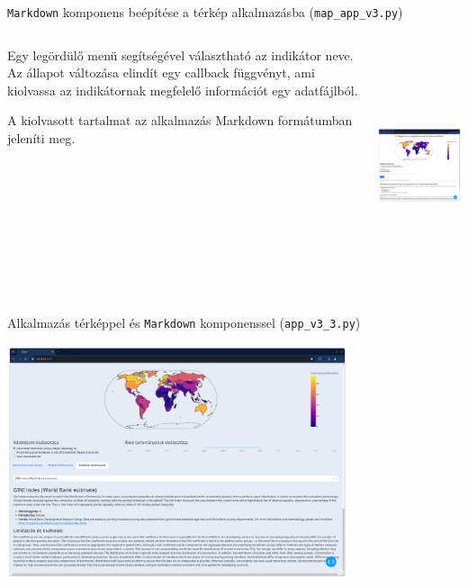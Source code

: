 \documentclass[english, aspectratio=169]{beamer}
\begin{document}
	\begin{frame}{\texttt{Markdown} komponens beépítése a térkép alkalmazásba (\texttt{map\_app\_v3.py})}
		\begin{columns}
			\begin{column}{.5\textwidth}
				Egy legördülő menü segítségével választható az indikátor neve. Az állapot változása elindít egy callback függvényt, ami kiolvassa az indikátornak megfelelő információt egy adatfájlból.\par\medskip
				A kiolvasott tartalmat az alkalmazás Markdown formátumban jeleníti meg.
			\end{column}
			\begin{column}{.5\textwidth}
				\begin{center}
					\includegraphics[width=7cm, height=7cm, keepaspectratio]{images/scatter_33.png}
				\end{center}
			\end{column}
		\end{columns}
	\end{frame}
	
	\begin{frame}{Alkalmazás térképpel és \texttt{Markdown} komponenssel (\texttt{app\_v3\_3.py})}
		\begin{center}
			\includegraphics[width=10cm, height=7cm, keepaspectratio]{images/scatter_32.png}
		\end{center}
	\end{frame}
\end{document}
